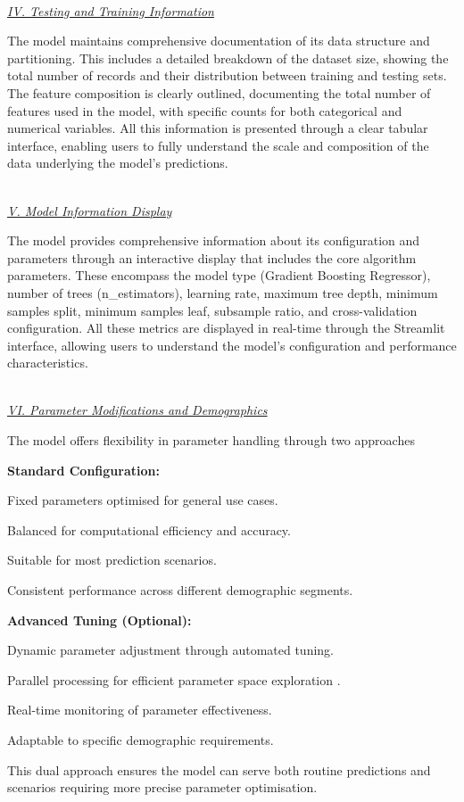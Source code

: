 \documentclass[11pt,a4paper]{article}
\newcommand{\SubItem}[1]{
  {\setlength\itemindent{13pt} \item[◦] #1}
}
\newcommand{\subsubsubsection}[1]{
  {\setlength\itemindent{13pt} \textit{\uline{\\#1\\}}} 
}
\begin{document}
\subsubsubsection{IV. Testing and Training Information}
The model maintains comprehensive documentation of its data structure and partitioning. This includes a detailed breakdown of the dataset size, showing the total number of records and their distribution between training and testing sets. The feature composition is clearly outlined, documenting the total number of features used in the model, with specific counts for both categorical and numerical variables. All this information is presented through a clear tabular interface, enabling users to fully understand the scale and composition of the data underlying the model's predictions.

\subsubsubsection{V. Model Information Display}
The model provides comprehensive information about its configuration and parameters through an interactive display that includes the core algorithm parameters. These encompass the model type (Gradient Boosting Regressor), number of trees (n\_estimators), learning rate, maximum tree depth, minimum samples split, minimum samples leaf, subsample ratio, and cross-validation configuration. All these metrics are displayed in real-time through the Streamlit interface, allowing users to understand the model's configuration and performance characteristics.

\subsubsubsection{VI. Parameter Modifications and Demographics}
The model offers flexibility in parameter handling through two approaches \cite{feurer:hyperparameter}
\begin{itemize}
\item \textbf{Standard Configuration:}
\SubItem{Fixed parameters optimised for general use cases.} 
\SubItem{Balanced for computational efficiency and accuracy.} 
\SubItem{Suitable for most prediction scenarios.} 
\SubItem{Consistent performance across different demographic segments.} 
\item \textbf{Advanced Tuning (Optional):}
\SubItem{Dynamic parameter adjustment through automated tuning.}
\SubItem{Parallel processing for efficient parameter space exploration \cite{feurer:hyperparameter}.}
\SubItem{Real-time monitoring of parameter effectiveness.}
\SubItem{Adaptable to specific demographic requirements.}
\end{itemize}
This dual approach ensures the model can serve both routine predictions and scenarios requiring more precise parameter optimisation.
\end{document}
